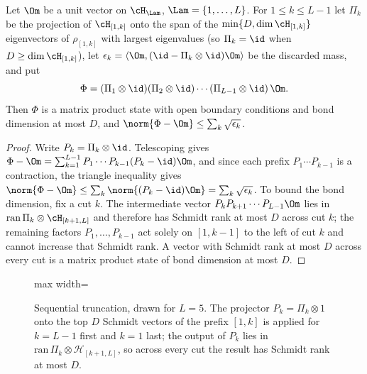 \begin{proposition}\label{prop:VC}
Let $\Om$ be a unit vector on $\cH_\Lam$, $\Lam=\{1,\dots,L\}$. For
$1\le k\le L-1$ let $\Pi_k$ be the projection of $\cH_{[1,k]}$ onto the
span of the $\min\{D,\dim\cH_{[1,k]}\}$ eigenvectors of $\rho_{[1,k]}$ with
largest eigenvalues (so $\Pi_k=\id$ when $D\ge\dim\cH_{[1,k]}$), let $\epsilon_k=\langle\Om,(\id-\Pi_k\otimes\id)\Om\rangle$ be the discarded
mass, and put
\[
 \Phi=(\Pi_1\otimes\id)(\Pi_2\otimes\id)\cdots(\Pi_{L-1}\otimes\id)\,\Om .
\]
Then $\Phi$ is a matrix product state with open boundary conditions and
bond dimension at most $D$, and $\norm{\Phi-\Om}\le\sum_k\sqrt{\epsilon_k}$.
\end{proposition}
\begin{proof}
Write $P_k=\Pi_k\otimes\id$. Telescoping gives
$\Phi-\Om=\sum_{k=1}^{L-1}P_1\cdots P_{k-1}(P_k-\id)\Om$, and since each
prefix $P_1\cdots P_{k-1}$ is a contraction, the triangle inequality gives
$\norm{\Phi-\Om}\le\sum_k\norm{(P_k-\id)\Om}=\sum_k\sqrt{\epsilon_k}$. To
bound the bond dimension, fix a cut $k$. The intermediate vector
$P_kP_{k+1}\cdots P_{L-1}\Om$ lies in
$\operatorname{ran}\Pi_k\otimes\cH_{[k+1,L]}$ and therefore has Schmidt rank
at most $D$ across cut $k$; the remaining factors $P_1,\dots,P_{k-1}$ act
solely on $[1,k-1]$ to the left of cut $k$ and cannot increase that Schmidt
rank. A vector with Schmidt rank at most $D$ across every cut is a matrix
product state of bond dimension at most $D$.
\end{proof}

\begin{figure}[t]
\centering
\begin{adjustbox}{max width=\linewidth}

\end{adjustbox}
\caption{Sequential truncation, drawn for $L=5$. The projector $P_k=\Pi_k\otimes 1$ onto the top $D$ Schmidt vectors of the prefix $[1,k]$ is applied for $k=L-1$ first and $k=1$ last; the output of $P_k$ lies in $\mathrm{ran}\,\Pi_k\otimes\mathcal H_{[k+1,L]}$, so across every cut the result has Schmidt rank at most $D$.}\label{fig:truncation-sequence}
\end{figure}

